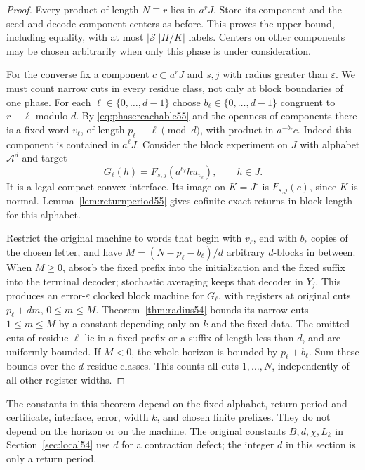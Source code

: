 \begin{proof}
Every product of length $N\equiv r$ lies in $a^rJ$. Store its component and the seed and decode component centers as before. This proves the upper bound, including equality, with at most $|\mathcal S||H/K|$ labels. Centers on other components may be chosen arbitrarily when only this phase is under consideration.

For the converse fix a component $c\subset a^rJ$ and $s,j$ with radius greater than $\varepsilon$. We must count narrow cuts in every residue class, not only at block boundaries of one phase. For each $\ell\in\{0,\ldots,d-1\}$ choose $b_\ell\in\{0,\ldots,d-1\}$ congruent to $r-\ell$ modulo $d$. By \eqref{eq:phasereachable55} and the openness of components there is a fixed word $v_\ell$, of length $p_\ell\equiv\ell\pmod d$, with product in $a^{-b_\ell}c$. Indeed this component is contained in $a^\ell J$. Consider the block experiment on $J$ with alphabet $\mathcal A^d$ and target
\[
        G_\ell(h)=F_{s,j}(a^{b_\ell}h u_{v_\ell}),\qquad h\in J.
\]
It is a legal compact-convex interface. Its image on $K=J^\circ$ is $F_{s,j}(c)$, since $K$ is normal. Lemma~\ref{lem:returnperiod55} gives cofinite exact returns in block length for this alphabet.

Restrict the original machine to words that begin with $v_\ell$, end with $b_\ell$ copies of the chosen letter, and have $M=(N-p_\ell-b_\ell)/d$ arbitrary $d$-blocks in between. When $M\ge0$, absorb the fixed prefix into the initialization and the fixed suffix into the terminal decoder; stochastic averaging keeps that decoder in $Y_j$. This produces an error-$\varepsilon$ clocked block machine for $G_\ell$, with registers at original cuts $p_\ell+dm$, $0\le m\le M$. Theorem~\ref{thm:radius54} bounds its narrow cuts $1\le m\le M$ by a constant depending only on $k$ and the fixed data. The omitted cuts of residue $\ell$ lie in a fixed prefix or a suffix of length less than $d$, and are uniformly bounded. If $M<0$, the whole horizon is bounded by $p_\ell+b_\ell$. Sum these bounds over the $d$ residue classes. This counts all cuts $1,\ldots,N$, independently of all other register widths.
\end{proof}
The constants in this theorem depend on the fixed alphabet, return period and certificate, interface, error, width $k$, and chosen finite prefixes. They do not depend on the horizon or on the machine. The original constants $B,d,\chi,L_k$ in Section~\ref{sec:local54} use $d$ for a contraction defect; the integer $d$ in this section is only a return period.

